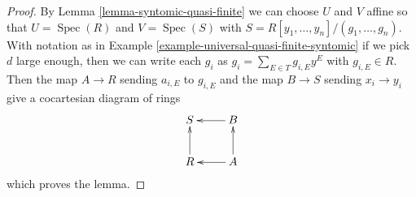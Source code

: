 \documentclass[10pt,a4paper]{amsart}
\theoremstyle{plain}
\theoremstyle{definition}
\theoremstyle{remark}
\numberwithin{equation}{subsection}
\def\Spec{\mathop{\mathrm{Spec}}}
\begin{document}
\begin{proof}
By Lemma \ref{lemma-syntomic-quasi-finite}
we can choose $U$ and $V$ affine so that
$U = \Spec(R)$ and $V = \Spec(S)$ with
$S = R[y_1, \ldots, y_n]/(g_1, \ldots, g_n)$.
With notation as in Example \ref{example-universal-quasi-finite-syntomic}
if we pick $d$ large enough, then we can write each $g_i$ as
$g_i = \sum_{E \in T} g_{i, E}y^E$ with $g_{i, E} \in R$.
Then the map $A \to R$ sending $a_{i, E}$ to $g_{i, E}$
and the map $B \to S$ sending $x_i \to y_i$ give a cocartesian
diagram of rings
$$
\xymatrix{
S & B \ar[l] \\
R \ar[u] & A \ar[l] \ar[u]
}
$$
which proves the lemma.
\end{proof}
\end{document}
